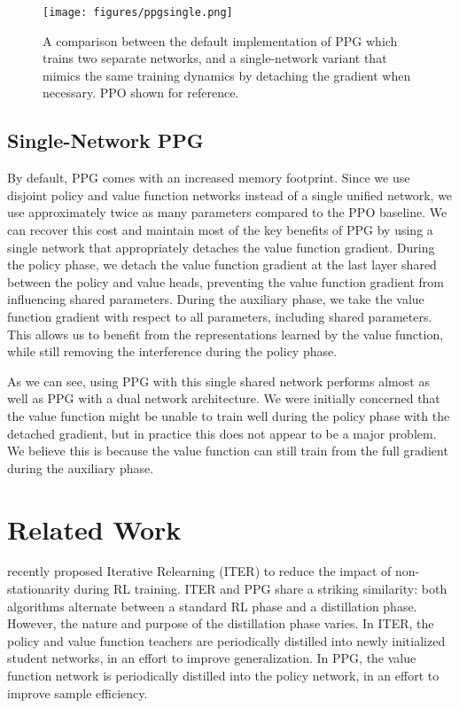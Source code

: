 \documentclass{article}
\begin{document}
\begin{figure*}
\centering
\texttt{[image: figures/ppgsingle.png]}
\caption{A comparison between the default implementation of PPG which trains two separate networks, and a single-network variant that mimics the same training dynamics by detaching the gradient when necessary. PPO shown for reference.}
\label{fig:detach}
\end{figure*}

\subsection{Single-Network PPG}

By default, PPG comes with an increased memory footprint. Since we use disjoint policy and value function networks instead of a single unified network, we use approximately twice as many parameters compared to the PPO baseline. We can recover this cost and maintain most of the key benefits of PPG by using a single network that appropriately detaches the value function gradient. During the policy phase, we detach the value function gradient at the last layer shared between the policy and value heads, preventing the value function gradient from influencing shared parameters. During the auxiliary phase, we take the value function gradient with respect to all parameters, including shared parameters. This allows us to benefit from the representations learned by the value function, while still removing the interference during the policy phase.

As we can see, using PPG with this single shared network performs almost as well as PPG with a dual network architecture. We were initially concerned that the value function might be unable to train well during the policy phase with the detached gradient, but in practice this does not appear to be a major problem. We believe this is because the value function can still train from the full gradient during the auxiliary phase.

\section{Related Work}

\cite{igl2020impact} recently proposed Iterative Relearning (ITER) to reduce the impact of non-stationarity during RL training. ITER and PPG share a striking similarity: both algorithms alternate between a standard RL phase and a distillation phase. However, the nature and purpose of the distillation phase varies. In ITER, the policy and value function teachers are periodically distilled into newly initialized student networks, in an effort to improve generalization. In PPG, the value function network is periodically distilled into the policy network, in an effort to improve sample efficiency.
\end{document}
